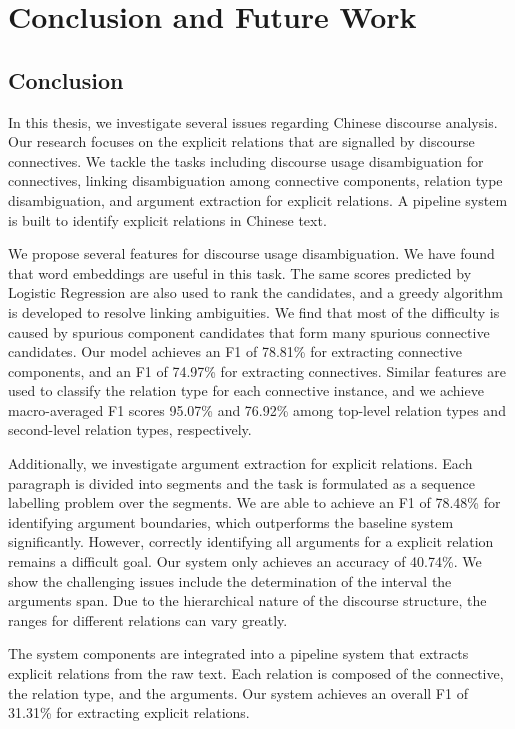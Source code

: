 %
%
%
\chapter{Conclusion and Future Work}
\label{c:future}

\section{Conclusion}

In this thesis, we investigate several issues
regarding Chinese discourse analysis. Our
research focuses on the explicit relations that
are signalled by discourse connectives.
We tackle the tasks including discourse
usage disambiguation for connectives,
linking disambiguation among connective components,
relation type disambiguation, and argument
extraction for explicit relations. A pipeline
system is built to identify explicit relations
in Chinese text.

We propose several features
for discourse usage disambiguation.
We have found that word embeddings are useful in this
task. The same scores predicted by Logistic Regression
are also used to rank the candidates, and 
a greedy algorithm is developed to resolve linking
ambiguities. We find that most of the difficulty
is caused by spurious component candidates that form
many spurious connective candidates. Our model achieves
an F1 of 78.81\% for extracting connective components,
and an F1 of 74.97\% for extracting connectives. Similar
features are used to classify the relation type for each
connective instance, and we achieve macro-averaged F1 scores
95.07\% and 76.92\% among top-level relation types and
second-level relation types, respectively.

Additionally, we investigate argument extraction for
explicit relations. Each paragraph is divided into segments
and the task is formulated as a sequence labelling problem
over the segments.
We are able to achieve an F1 of 78.48\% for identifying
argument boundaries, which outperforms the baseline system
significantly. However, correctly identifying all arguments
for a explicit relation remains a difficult goal. Our
system only achieves an accuracy of 40.74\%. We show
the challenging issues include the determination of
the interval the arguments span. Due to the hierarchical
nature of the discourse structure, the ranges for
different relations can vary greatly.

The system components are integrated into a pipeline
system that extracts explicit relations from the raw text.
Each relation is composed of the connective, the relation type,
and the arguments. Our system achieves an overall F1 of 31.31\%
for extracting explicit relations.

